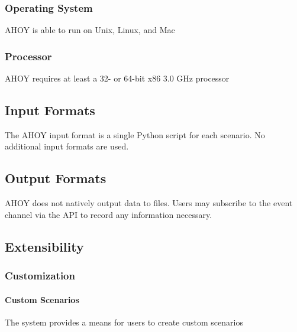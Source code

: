 \documentclass[titlepage]{article}
\begin{document}
\subsubsection{Operating System%
  \label{operating-system}%
}

AHOY is able to run on Unix, Linux, and Mac


\subsubsection{Processor%
  \label{processor}%
}

AHOY requires at least a 32- or 64-bit x86 3.0 GHz processor


\subsection{Input Formats%
  \label{input-formats}%
}

The AHOY input format is a single Python script for each scenario.  No additional input formats are used.


\subsection{Output Formats%
  \label{output-formats}%
}

AHOY does not natively output data to files.  Users may subscribe to the event channel via the API to record any information necessary.

\subsection{Extensibility%
  \label{extensibility}%
}
\subsubsection{Customization}
    \paragraph{Custom Scenarios} The system provides a means for users to create custom scenarios
\end{document}
